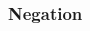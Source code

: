 \vspace{-10pt}
\hrulefill
\vspace{-10pt}
%
%
%
%
%
\begin{multicols}{2}
\subsubsection*{Negation}


\begin{pf}
\open
	\ellipsesline
	\ellipsesline
\close
{}
\end{pf}
\vfill\null
\columnbreak

\begin{pf}
\open
	\ellipsesline
	\ellipsesline
\close
{}
\end{pf}


\end{multicols} %

